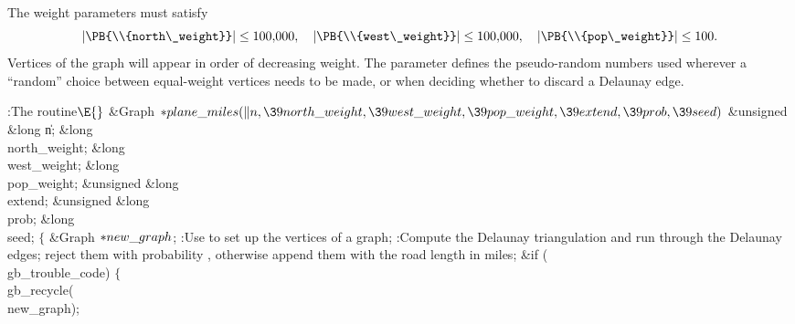 The weight parameters must satisfy
$$ \vert\PB{\\{north\_weight}}\vert\le100{,}000,\quad
\vert\PB{\\{west\_weight}}\vert\le100{,}000,\quad
\vert\PB{\\{pop\_weight}}\vert\le100.$$
Vertices of the graph will appear in order of decreasing weight.
The  parameter defines the pseudo-random numbers used wherever
a ``random'' choice between equal-weight vertices needs to be made,
or when deciding whether to discard a Delaunay edge.

\Y\B\4:The  routine\X${}\E{}$\6
\1\1\&{Graph} ${}{*}\\{plane\_miles}(\|n,\39\\{north\_weight},\39\\{west%
\_weight},\39\\{pop\_weight},\39\\{extend},\39\\{prob},\39\\{seed}){}$\6
\&{unsigned} \&{long} \|n;\6
\&{long} \\{north\_weight};%
\6
\&{long} \\{west\_weight};%
\6
\&{long} \\{pop\_weight};%
\6
\&{unsigned} \&{long} \\{extend};\6
\&{unsigned} \&{long} \\{prob};\6
\&{long} \\{seed};\2\2\6
${}\{{}$\5
\1\&{Graph} ${}{*}\\{new\_graph}{}$;\7
:Use  to set up the vertices of a graph\X;\6
:Compute the Delaunay triangulation and run through the Delaunay edges;
reject them with probability , otherwise append them
with the road length in miles\X;\6
\&{if} (\\{gb\_trouble\_code})\5
${}\{{}$\1\6
\\{gb\_recycle}(\\{new\_graph});\6
